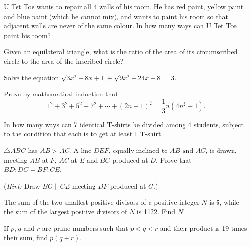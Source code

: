 \begin{problems}
    \problem U Tet Toe wants to repair all 4 walls of his room. He has red
    paint, yellow paint and blue paint (which he cannot mix), and wants to
    paint his room so that adjacent walls are never of the same colour. In how
    many ways can U Tet Toe paint his room?
    
    \problem Given an equilateral triangle, what is the ratio of the area of
    its circumscribed circle to the area of the inscribed circle?
    
    \problem Solve the equation $\sqrt{3x^2 - 8x + 1} + \sqrt{9x^2 - 24x - 8} =
    3$. 
    
    \problem Prove by mathematical induction that \[1^2 + 3^2 + 5^2 + 7^2 +
    \cdots + (2n - 1)^2 = \frac{1}{3}n(4n^2 - 1).\] 
    
    \problem In how many ways can 7 identical T-shirts be divided among 4
    students, subject to the condition that each is to get at least 1 T-shirt. 
    
    \problem $\triangle ABC$ has $AB > AC$. A line $DEF$, equally inclined to
    $AB$ and $AC$, is drawn, meeting $AB$ at $F$, $AC$ at $E$ and $BC$ produced
    at $D$. Prove that $BD : DC = BF : CE$.
    
    (\textit{Hint:} Draw $BG \parallel CE$ meeting $DF$ produced at $G$.) 
    
    \problem The sum of the two smallest positive divisors of a positive
    integer $N$ is 6, while the sum of the largest positive divisors of $N$ is
    1122. Find $N$. 
    
    \problem If $p$, $q$ and $r$ are prime numbers such that $p < q < r$ and
    their product is 19 times their sum, find $p(q + r)$.
\end{problems}
